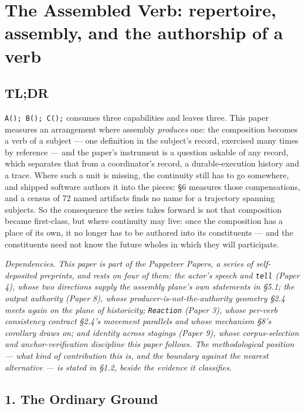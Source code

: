 \documentclass[
]{article}
\begin{document}
\section{The Assembled Verb: repertoire, assembly, and the authorship of
a
verb}\label{the-assembled-verb-repertoire-assembly-and-the-authorship-of-a-verb}

\subsection{TL;DR}\label{tldr}

\texttt{A();\ B();\ C();} consumes three capabilities and leaves three.
This paper measures an arrangement where assembly \emph{produces} one:
the composition becomes a verb of a subject --- one definition in the
subject's record, exercised many times by reference --- and the paper's
instrument is a question askable of any record, which separates that
from a coordinator's record, a durable-execution history and a trace.
Where such a unit is missing, the continuity still has to go somewhere,
and shipped software authors it into the pieces: §6 measures those
compensations, and a census of 72 named artifacts finds no name for a
trajectory spanning subjects. So the consequence the series takes
forward is not that composition became first-class, but where continuity
may live: once the composition has a place of its own, it no longer has
to be authored into its constituents --- and the constituents need not
know the future wholes in which they will participate.

\emph{Dependencies. This paper is part of the Puppeteer Papers, a series
of self-deposited preprints, and rests on four of them: the actor's
speech and \texttt{tell} (Paper 4), whose two directions supply the
assembly plane's own statements in §5.1; the output authority (Paper 8),
whose producer-is-not-the-authority geometry §2.4 meets again on the
plane of historicity; \texttt{Reaction} (Paper 3), whose per-verb
consistency contract §2.4's movement parallels and whose mechanism §8's
corollary draws on; and identity across stagings (Paper 9), whose
corpus-selection and anchor-verification discipline this paper follows.
The methodological position --- what kind of contribution this is, and
the boundary against the nearest alternative --- is stated in §1.2,
beside the evidence it classifies.}

\subsection{1. The Ordinary Ground}\label{the-ordinary-ground}
\end{document}
